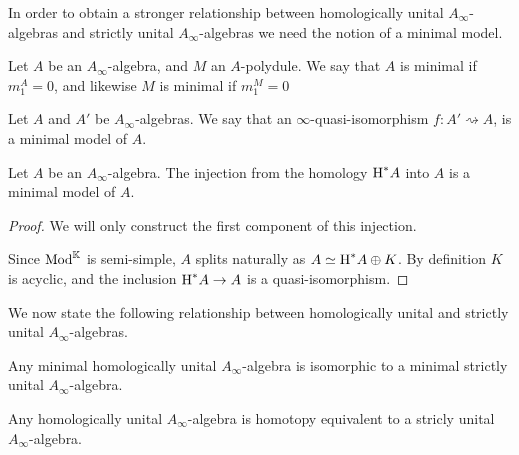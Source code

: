 \documentclass[../thesis.tex]{subfiles}
\begin{document}
            In order to obtain a stronger relationship between homologically unital $A_\infty$-algebras and strictly unital $A_\infty$-algebras we need the notion of a minimal model. 

            \begin{definition}
                Let $A$ be an $A_\infty$-algebra, and $M$ an $A$-polydule. We say that $A$ is minimal if $m_1^A = 0$, and likewise $M$ is minimal if $m_1^M = 0$
            \end{definition}

            \begin{definition}
                Let $A$ and $A'$ be $A_\infty$-algebras. We say that an $\infty$-quasi-isomorphism $f : A' \rightsquigarrow A$, is a minimal model of $A$.
            \end{definition}
            
            \begin{thm}\label{thm: minimal-models}
                Let $A$ be an $A_\infty$-algebra. The injection from the homology $\tt{H}^*A$ into $A$ is a minimal model of $A$.
            \end{thm}

            \begin{proof}
                We will only construct the first component of this injection.

                Since $\tt{Mod}^\mathbb{K}$ is semi-simple, $A$ splits naturally as $A \simeq \tt{H}^*A \oplus K$. By definition $K$ is acyclic, and the inclusion $\tt{H}^*A \rightarrow A$ is a quasi-isomorphism. 
            \end{proof}

            We now state the following relationship between homologically unital and strictly unital $A_\infty$-algebras.

            \begin{thm}\label{thm: hu-to-su}
                Any minimal homologically unital $A_\infty$-algebra is isomorphic to a minimal strictly unital $A_\infty$-algebra.
            \end{thm}

            \begin{corollary}\label{cor: unit-strict-alg}
                Any homologically unital $A_\infty$-algebra is homotopy equivalent to a stricly unital $A_\infty$-algebra.
            \end{corollary}
\end{document}
